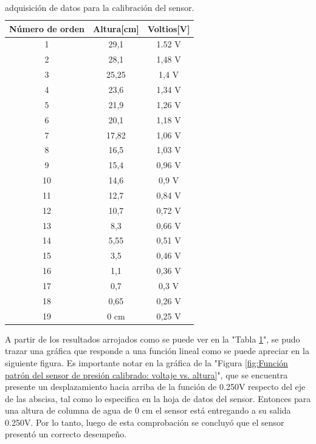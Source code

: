 \begin{table}[h]
	\centering
	\caption[caption corto]{adquisición de datos para la calibración del sensor.}
	\begin{tabular}{c c c}    
		\toprule
		\textbf{Número de orden}     & \textbf{Altura[cm]} & \textbf{Voltios[V]} \\
		\midrule
		1  & 29,1          &  1.52 V \\		
		2  & 28,1          &  1,48 V \\
		3  & 25,25         &  1,4 V \\
		4  & 23,6          &  1,34 V \\
		5  & 21,9          & 1,26 V \\
		6  & 20,1          & 1,18 V \\
		7  & 17,82         & 1,06 V \\
		8  & 16,5          & 1,03 V \\
		9  & 15,4          & 0,96 V \\
		10 & 14,6          & 0,9 V \\
		11 & 12,7          & 0,84 V \\
		12 & 10,7          & 0,72 V \\
		13 & 8,3           & 0,66  V \\
		14 & 5,55          & 0,51 V \\
		15 & 3,5          & 0,46 V \\
		16 & 1,1           & 0,36 V \\
		17 & 0,7           & 0,3 V \\
		18 & 0,65          & 0,26 V \\
		19 & 0 cm            & 0,25 V \\
	
		\bottomrule
		\hline
	\end{tabular}
	\label{tab:calibración del sensor-función patrón}
\end{table}

A partir de los resultados arrojados como se puede ver en la "Tabla \ref{tab:calibración del sensor-función patrón}", se pudo trazar una gráfica que responde a una función lineal como se puede apreciar en la siguiente figura. 
Es importante notar en la gráfica de la "Figura \ref{fig:Función patrón del sensor de presión calibrado: voltaje vs. altura}", que se encuentra presente un desplazamiento hacia arriba de la función de 0.250V respecto del eje de las abscisa, tal como lo especifica en la hoja de datos del sensor. Entonces para una altura de columna de agua de 0 cm el sensor está  entregando a su salida 0.250V. 
Por lo tanto, luego de esta comprobación se concluyó que el sensor presentó un correcto desempeño.

